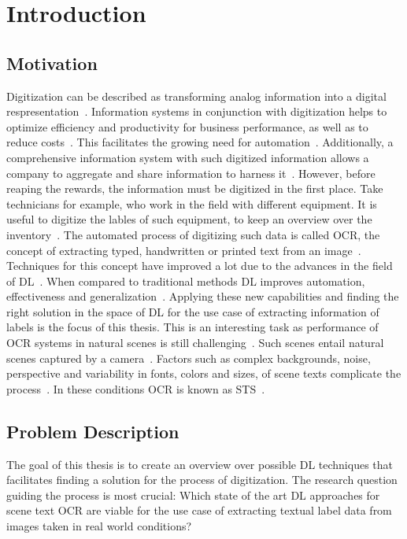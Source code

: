 \chapter{Introduction}\label{ch:intro}
\section{Motivation}
Digitization can be described as transforming analog information into a digital
respresentation~\citep{imgrund_approaching_2018}.
Information systems in conjunction with digitization helps to optimize efficiency and productivity
for business performance, as well as to reduce costs~\citep{imgrund_approaching_2018}.
This facilitates the growing need for automation~\citep{imgrund_approaching_2018}.
Additionally, a comprehensive information system with such digitized information allows a company
to aggregate and share information to harness it~\citep{goodhue_impact_1992}.
However, before reaping the rewards, the information must be digitized in the first place.
Take technicians for example, who work in the field with different equipment.
It is useful to digitize the lables of such equipment, to keep an overview over the
inventory~\citep{abramowicz_business_2019}.
The automated process of digitizing such data is called \ac{OCR}, the concept of extracting typed,
handwritten or printed text from an image~\citep{zhao_improving_2020}.
Techniques for this concept have improved a lot due to the advances in the field of
\ac{DL}~\citep{zhao_improving_2020}.
When compared to traditional methods \ac{DL} improves automation, effectiveness and
generalization~\citep{chen_text_2021}.
Applying these new capabilities and finding the right solution in the space of \ac{DL} for the
use case of extracting information of labels is the focus of this thesis.
This is an interesting task as performance of \ac{OCR} systems in natural scenes is still
challenging~\citep{zhao_improving_2020, chen_text_2021}.
Such scenes entail natural scenes captured by a camera~\citep{chen_text_2021, baek_what_2019}.
Factors such as complex backgrounds, noise, perspective and variability in fonts, colors and sizes,
of scene texts complicate the process~\citep{hu_gtc_2020,chen_text_2021,baek_what_2019}.
In these conditions \ac{OCR} is known as \ac{STS}~\citep{long_scene_2021}.

\section{Problem Description}\label{se:problem}
The goal of this thesis is to create an overview over possible \ac{DL} techniques that facilitates
finding a solution for the process of digitization.
The research question guiding the process is most crucial:
Which state of the art \ac{DL} approaches for scene text \ac{OCR} are viable for the use case of
extracting textual label data from images taken in real world conditions?

